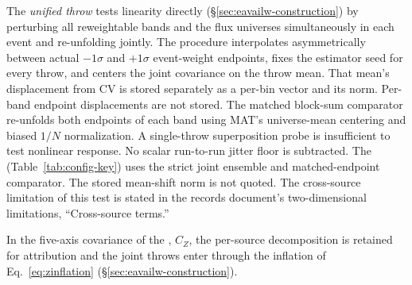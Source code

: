 The \emph{unified throw} tests linearity directly (\S\ref{sec:eavailw-construction}) by perturbing all reweightable bands and the flux universes simultaneously in each event and re-unfolding jointly. The procedure interpolates asymmetrically between actual $-1\sigma$ and $+1\sigma$ event-weight endpoints, fixes the estimator seed for every throw, and centers the joint covariance on the throw mean. That mean's displacement from CV is stored separately as a per-bin vector and its norm. Per-band endpoint displacements are not stored. The matched block-sum comparator re-unfolds both endpoints of each band using MAT's universe-mean centering and biased $1/N$ normalization. A single-throw superposition probe is insufficient to test nonlinear response. No scalar run-to-run jitter floor is subtracted. The \resFiveAxis{} (Table~\ref{tab:config-key}) uses the strict joint ensemble and matched-endpoint comparator. The stored mean-shift norm is not quoted. The cross-source limitation of this test is stated in the records document's two-dimensional limitations, ``Cross-source terms.''

In the five-axis covariance of the \resFiveAxis{}, $C_Z$, the per-source decomposition is retained for attribution and the joint throws enter through the inflation of Eq.~\eqref{eq:zinflation} (\S\ref{sec:eavailw-construction}).


